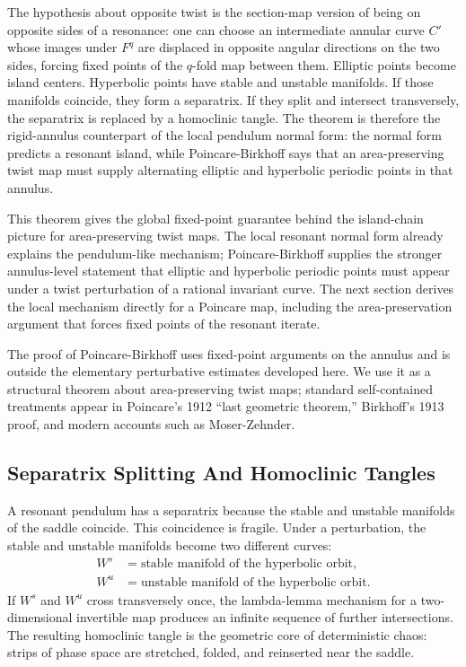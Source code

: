 The hypothesis about opposite twist is the section-map version of being on
opposite sides of a resonance: one can choose an intermediate annular curve
\(C'\) whose images under \(F^q\) are displaced in opposite angular directions
on the two sides, forcing fixed points of the \(q\)-fold map between them.
Elliptic points become island centers. Hyperbolic
points have stable and unstable manifolds. If those manifolds coincide, they
form a separatrix. If they split and intersect transversely, the separatrix is
replaced by a homoclinic tangle.
The theorem is therefore the rigid-annulus counterpart of the local pendulum
normal form: the normal form predicts a resonant island, while
Poincare-Birkhoff says that an area-preserving twist map must supply alternating
elliptic and hyperbolic periodic points in that annulus.

This theorem gives the global fixed-point guarantee behind the island-chain
picture for area-preserving twist maps. The local resonant normal form already
explains the pendulum-like mechanism; Poincare-Birkhoff supplies the stronger
annulus-level statement that elliptic and hyperbolic periodic points must
appear under a twist perturbation of a rational invariant curve. The next
section derives the local mechanism directly for a Poincare map, including the
area-preservation argument that forces fixed points of the resonant iterate.

The proof of Poincare-Birkhoff uses fixed-point arguments on the annulus and is
outside the elementary perturbative estimates developed here. We use it as a
structural theorem about area-preserving twist maps; standard self-contained
treatments appear in Poincare's 1912 ``last geometric theorem,'' Birkhoff's
1913 proof, and modern accounts such as Moser-Zehnder.

\subsection{Separatrix Splitting And Homoclinic Tangles}
\label{subsec:separatrix-splitting-homoclinic-tangles}

A resonant pendulum has a separatrix because the stable and unstable manifolds
of the saddle coincide. This coincidence is fragile. Under a perturbation, the
stable and unstable manifolds become two different curves:
\[
  \begin{aligned}
  W^s&=\text{stable manifold of the hyperbolic orbit},\\
  W^u&=\text{unstable manifold of the hyperbolic orbit}.
  \end{aligned}
\]
If \(W^s\) and \(W^u\) cross transversely once, the lambda-lemma mechanism for a
two-dimensional invertible map produces an infinite sequence of further
intersections. The resulting homoclinic tangle is the geometric core of
deterministic chaos: strips of phase space are stretched, folded, and reinserted
near the saddle.

